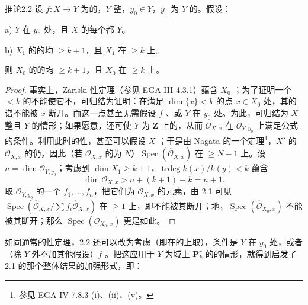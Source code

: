 \begin{SGAresult}{推论}{2.2}
设 $f:X\to Y$ 为的，$Y$ 整，$y_0\in Y$，$y_1$ 为 $Y$ 的。假设：

 a) $Y$ 在 $y_0$ 处，且 $X$ 的每个都 $Y$。

 b) $X_1$ 的的均 $\geq k+1$，且 $X_1$ 在 $\geq k$ 上。

则 $X_0$ 的的均 $\geq k+1$，且 $X_0$ 在 $\geq k$ 上。
\end{SGAresult}
\begin{proof}
事实上，Zariski 性定理（参见 EGA III 4.3.1）蕴含 $X_0$ ；为了证明一个 $<k$ 的不能使它不，可归结为证明：在满足 $\dim\overline{\{x\}}<k$ 的点 $x\in X_0$ 处，其的谱不能被 $x$ 断开。而这一点甚至无需假设 $f$ 、或 $Y$ 在 $y_0$ 处。为此，可归结为 $X$ 整且 $Y$ 的情形；如果愿意，还可使 $Y$ 为 $\mathbf Z$ 上的，从而 $\mathcal O_{X,x}$ 在 $\mathcal O_{Y,y_0}$ 上满足公式的条件。利用此时的性，甚至可以假设 $X$ ；于是由 Nagata 的一个定理\footnote{参见 EGA IV 7.8.3 (i)、(ii)、(v)。}，$X'$ 的 $\mathcal O_{X,x}$ 的仍，因此（若 $\mathcal O_{X,x}$ 的为 $N$）$\operatorname{Spec}(\widehat{\mathcal O}_{X,x})$ 在 $\geq N-1$ 上。设 $n=\dim\mathcal O_{Y,y_0}$；考虑到 $\dim X_1\geq k+1$，$\operatorname{trdeg}k(x)/k(y)<k$ 蕴含
\[
\dim\mathcal O_{X,x}>n+(k+1)-k=n+1.
\]
取 $\mathcal O_{Y,y_0}$ 的一个 $f_1,\ldots,f_n$，把它们为 $\mathcal O_{X,x}$ 的元素，由 2.1 可见 $\operatorname{Spec}(\widehat{\mathcal O}_{X,x}/\sum f_i\widehat{\mathcal O}_{X,x})$ 在 $\geq1$ 上，即不能被其断开；地，$\operatorname{Spec}(\widehat{\mathcal O}_{X_0,x})$ 不能被其断开；那么 $\operatorname{Spec}(\mathcal O_{X_0,x})$ 更是如此。
\end{proof}
如同通常的性定理，2.2 还可以改为考虑（即在的上取），条件是 $Y$ 在 $y_0$ 处，或者（除 $Y$ 外不加其他假设）$f$ 。把这应用于 $Y$ 为域上 $\mathbf P^r_k$ 的的情形，就得到启发了 2.1 的那个整体结果的加强形式，即：


